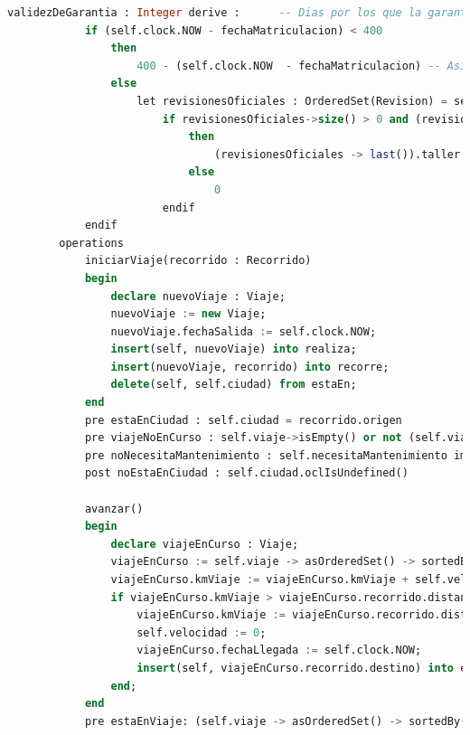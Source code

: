 \documentclass[12pt.a4paper]{article}
\begin{document}
\begin{lstlisting}[style = useNormal,language=SQL, caption={Codigo Use del apartado B}]
            validezDeGarantia : Integer derive :      -- Dias por los que la garantia proporcionada por un tallerOficial esta activa
            if (self.clock.NOW - fechaMatriculacion) < 400 
                then 
                    400 - (self.clock.NOW  - fechaMatriculacion) -- Asignamos el valor de la validez restante
                else
                    let revisionesOficiales : OrderedSet(Revision) = self.revision -> select(rev | rev.taller.oclIsKindOf(Oficial)) -> sortedBy(rev | rev.fechaInicio) in
                        if revisionesOficiales->size() > 0 and (revisionesOficiales -> last()).fechaFin <> null and (self.clock.NOW - (revisionesOficiales -> last()).fechaFin) < (revisionesOficiales -> last()).taller.oclAsType(Oficial).garantia
                            then
                                (revisionesOficiales -> last()).taller.oclAsType(Oficial).garantia - (self.clock.NOW - (revisionesOficiales -> last()).fechaFin)
                            else 
                                0
                        endif          
            endif               
        operations
            iniciarViaje(recorrido : Recorrido)
            begin
                declare nuevoViaje : Viaje;
                nuevoViaje := new Viaje;
                nuevoViaje.fechaSalida := self.clock.NOW;
                insert(self, nuevoViaje) into realiza;
                insert(nuevoViaje, recorrido) into recorre;
                delete(self, self.ciudad) from estaEn;
            end
            pre estaEnCiudad : self.ciudad = recorrido.origen
            pre viajeNoEnCurso : self.viaje->isEmpty() or not (self.viaje->asOrderedSet()->sortedBy(v | v.fechaSalida)->last().fechaLlegada = null)
            pre noNecesitaMantenimiento : self.necesitaMantenimiento implies self.viaje -> forAll(v | v.fechaLlegada <> null)
            post noEstaEnCiudad : self.ciudad.oclIsUndefined()
            
            avanzar()
            begin
                declare viajeEnCurso : Viaje;
                viajeEnCurso := self.viaje -> asOrderedSet() -> sortedBy(v | v.fechaSalida) -> last();
                viajeEnCurso.kmViaje := viajeEnCurso.kmViaje + self.velocidad;
                if viajeEnCurso.kmViaje > viajeEnCurso.recorrido.distancia then 
                    viajeEnCurso.kmViaje := viajeEnCurso.recorrido.distancia;       
                    self.velocidad := 0;
                    viajeEnCurso.fechaLlegada := self.clock.NOW;
                    insert(self, viajeEnCurso.recorrido.destino) into estaEn;
                end;
            end
            pre estaEnViaje: (self.viaje -> asOrderedSet() -> sortedBy( v | v.fechaSalida) -> last()).fechaLlegada = null and self.ciudad.oclIsUndefined()
    

\end{lstlisting}
\end{document}
